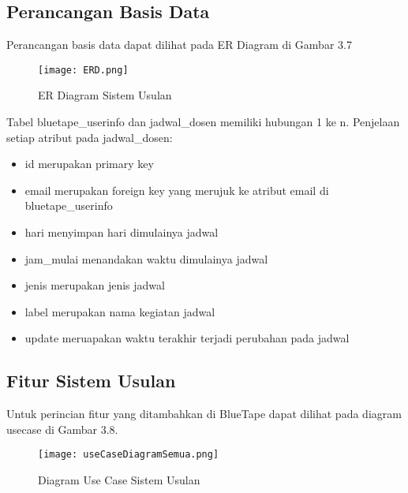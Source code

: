 \subsection{Perancangan Basis Data}
Perancangan basis data dapat dilihat pada ER Diagram di Gambar 3.7
\begin{figure} [H]
	\centering  
	\texttt{[image: ERD.png]}
	\caption[ER Diagram Sistem Usulan]{ER Diagram Sistem Usulan} 
\end{figure}
Tabel bluetape\_userinfo dan jadwal\_dosen memiliki hubungan 1 ke n. 
Penjelaan setiap atribut pada jadwal\_dosen:
\begin{itemize}
	\item id merupakan primary key
	\item email merupakan foreign key yang merujuk ke atribut email di bluetape\_userinfo
	\item hari menyimpan hari dimulainya jadwal
	\item jam\_mulai menandakan waktu dimulainya jadwal
	\item jenis merupakan jenis jadwal
	\item label merupakan nama kegiatan jadwal
	\item update meruapakan waktu terakhir terjadi perubahan pada jadwal
\end{itemize}
\subsection{Fitur Sistem Usulan}
Untuk perincian fitur yang ditambahkan di BlueTape dapat dilihat pada diagram usecase di Gambar 3.8.
\begin{figure} [H]
	\centering  
	\texttt{[image: useCaseDiagramSemua.png]}
	\caption[Diagram Use Case Sistem Usulan]{Diagram Use Case Sistem Usulan} 
	\label{fig:flow-chart-CodeIgniter} 
\end{figure}

